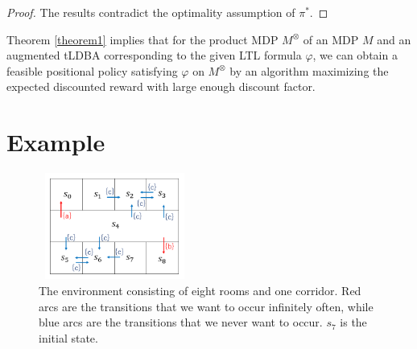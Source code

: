 \documentclass[letterpaper, 10 pt, conference]{ieeeconf}  %
\begin{document}
\begin{proof}
The results contradict the optimality assumption of $\pi^{\ast}$.
\end{proof}

Theorem \ref{theorem1} implies that for the product MDP $M^{\otimes}$ of an MDP $M$ and an augmented tLDBA corresponding to the given LTL formula $\varphi$, we can obtain a feasible positional policy satisfying $\varphi$ on $M^{\otimes}$ by an algorithm maximizing the expected discounted reward with large enough discount factor.


\section{Example}

\begin{figure}[bp]
    \centering
    \includegraphics[bb=0 0 377 290,height=3.5cm,width=5cm]{MDP_corridor.png}
    \caption{The environment consisting of eight rooms and one corridor. Red arcs are the transitions that we want to occur infinitely often, while blue arcs are the transitions that we never want to occur. $s_7$ is the initial state.}
    \label{Grid1}
\end{figure}
\end{document}
